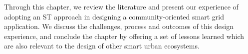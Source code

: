 Through this chapter, we review the literature and present our experience of adopting an ST approach in designing a community-oriented smart grid application. We discuss the challenges, process and outcomes of this design experience, and conclude the chapter by offering a set of lessons learned which are also relevant to the design of other smart urban ecosystems. 


